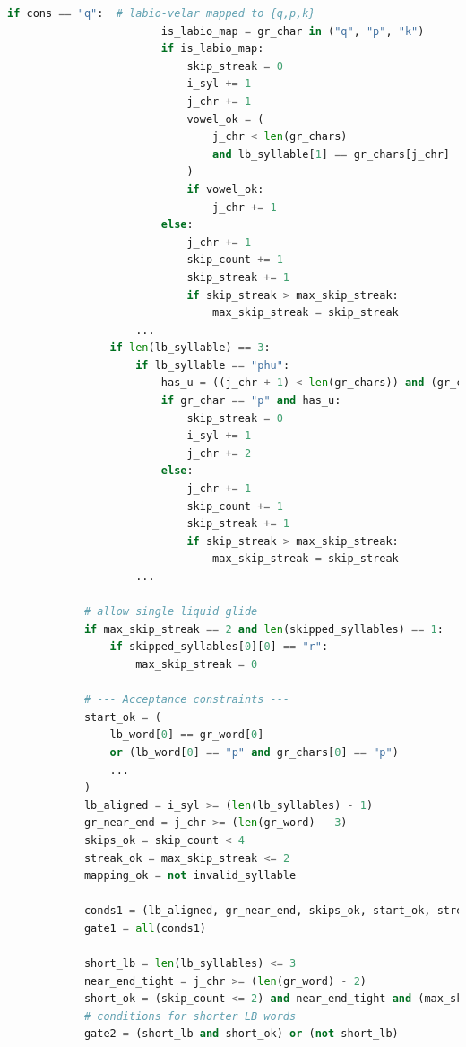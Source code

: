 \begin{lstlisting}[language=Python, caption=Brute-Force matching algorithm, breaklines=true, postbreak=\mbox{\hspace{50pt}\textcolor{red}{$\hookrightarrow$}\space}]
                    if cons == "q":  # labio-velar mapped to {q,p,k}
                        is_labio_map = gr_char in ("q", "p", "k")
                        if is_labio_map:
                            skip_streak = 0
                            i_syl += 1
                            j_chr += 1
                            vowel_ok = (
                                j_chr < len(gr_chars)
                                and lb_syllable[1] == gr_chars[j_chr]
                            )
                            if vowel_ok:
                                j_chr += 1
                        else:
                            j_chr += 1
                            skip_count += 1
                            skip_streak += 1
                            if skip_streak > max_skip_streak:
                                max_skip_streak = skip_streak
                    ...
                if len(lb_syllable) == 3:
                    if lb_syllable == "phu":
                        has_u = ((j_chr + 1) < len(gr_chars)) and (gr_chars[j_chr + 1] == "u")
                        if gr_char == "p" and has_u:
                            skip_streak = 0
                            i_syl += 1
                            j_chr += 2
                        else:
                            j_chr += 1
                            skip_count += 1
                            skip_streak += 1
                            if skip_streak > max_skip_streak:
                                max_skip_streak = skip_streak
                    ...

            # allow single liquid glide
            if max_skip_streak == 2 and len(skipped_syllables) == 1:
                if skipped_syllables[0][0] == "r":
                    max_skip_streak = 0

            # --- Acceptance constraints ---
            start_ok = (
                lb_word[0] == gr_word[0]
                or (lb_word[0] == "p" and gr_chars[0] == "p")
                ...
            )
            lb_aligned = i_syl >= (len(lb_syllables) - 1)
            gr_near_end = j_chr >= (len(gr_word) - 3)
            skips_ok = skip_count < 4
            streak_ok = max_skip_streak <= 2
            mapping_ok = not invalid_syllable

            conds1 = (lb_aligned, gr_near_end, skips_ok, start_ok, streak_ok, mapping_ok)
            gate1 = all(conds1)

            short_lb = len(lb_syllables) <= 3
            near_end_tight = j_chr >= (len(gr_word) - 2)
            short_ok = (skip_count <= 2) and near_end_tight and (max_skip_streak < 2)
            # conditions for shorter LB words
            gate2 = (short_lb and short_ok) or (not short_lb)


\end{lstlisting}
